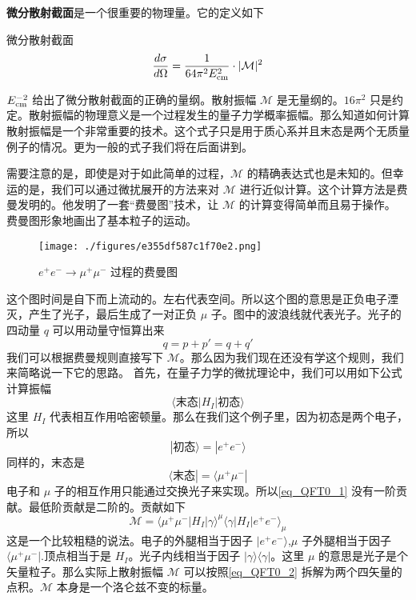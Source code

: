 \textbf{微分散射截面}是一个很重要的物理量。它的定义如下
\begin{definition}{微分散射截面}
\begin{equation}\label{eq_QFT0_3}
\frac{d\sigma}{d\Omega} = \frac{1}{64\pi^2E_{\rm cm}^2}\cdot |\mathcal M|^2
\end{equation}
\end{definition}
$E_{\rm cm}^{-2}$ 给出了微分散射截面的正确的量纲。散射振幅 $\mathcal M$ 是无量纲的。$16\pi^2$ 只是约定。散射振幅的物理意义是一个过程发生的量子力学概率振幅。那么知道如何计算散射振幅是一个非常重要的技术。这个式子只是用于质心系并且末态是两个无质量例子的情况。更为一般的式子我们将在后面讲到。

需要注意的是，即使是对于如此简单的过程，$\mathcal M$ 的精确表达式也是未知的。但幸运的是，我们可以通过微扰展开的方法来对 $\mathcal M$ 进行近似计算。这个计算方法是费曼发明的。他发明了一套“费曼图”技术，让 $\mathcal M$ 的计算变得简单而且易于操作。
费曼图形象地画出了基本粒子的运动。

\begin{figure}[ht]
\centering
\texttt{[image: ./figures/e355df587c1f70e2.png]}
\caption{$e^+e^-\rightarrow\mu^+\mu^-$ 过程的费曼图} \label{fig_QFT0_2}
\end{figure}

这个图时间是自下而上流动的。左右代表空间。所以这个图的意思是正负电子湮灭，产生了光子，最后生成了一对正负 $\mu$ 子。图中的波浪线就代表光子。光子的四动量 $q$ 可以用动量守恒算出来
\begin{equation}
q=p+p'=q+q'
\end{equation}
我们可以根据费曼规则直接写下 $\mathcal M$。那么因为我们现在还没有学这个规则，我们来简略说一下它的思路。 首先，在量子力学的微扰理论中，我们可以用如下公式计算振幅
\begin{equation} \label{eq_QFT0_1}
\langle \text{末态} |H_I| \text{初态} \rangle
\end{equation}
这里 $H_I$ 代表相互作用哈密顿量。那么在我们这个例子里，因为初态是两个电子，所以
\begin{equation}
| \text{初态} \rangle = | e^+ e^- \rangle
\end{equation}
同样的，末态是
\begin{equation}
\langle \text{末态} | = \langle \mu^+ \mu^- |
\end{equation}
电子和 $\mu$ 子的相互作用只能通过交换光子来实现。所以\autoref{eq_QFT0_1} 没有一阶贡献。最低阶贡献是二阶的。贡献如下
\begin{equation}\label{eq_QFT0_2}
\mathcal M = \langle \mu^+ \mu^- | H_I | \gamma \rangle^\mu \langle \gamma | H_I | e^+ e^- \rangle_\mu 
\end{equation}
这是一个比较粗糙的说法。电子的外腿相当于因子 $| e^+ e^- \rangle $,$\mu$ 子外腿相当于因子 $\langle \mu^+ \mu^- |$.顶点相当于是 $H_I$。光子内线相当于因子 $|\gamma\rangle\langle\gamma|$。这里 $\mu$ 的意思是光子是个矢量粒子。那么实际上散射振幅 $\mathcal M$ 可以按照\autoref{eq_QFT0_2} 拆解为两个四矢量的点积。$\mathcal M$ 本身是一个洛仑兹不变的标量。

